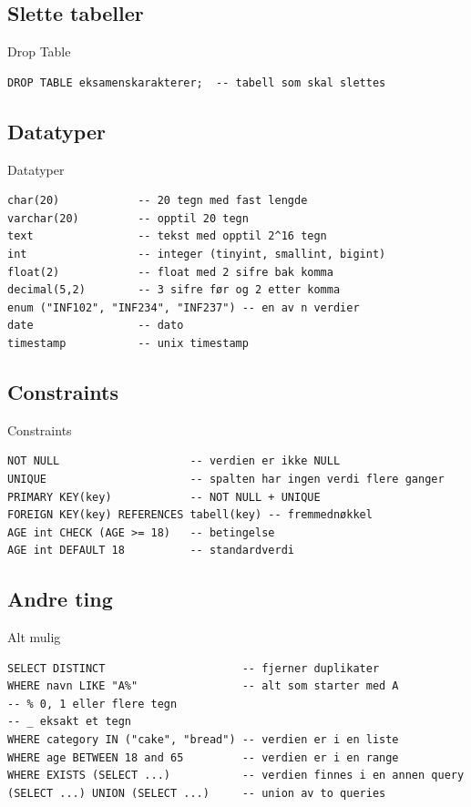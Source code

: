 \subsection*{Slette tabeller}
\begin{frame}[fragile]{Drop Table}
\begin{verbatim}
DROP TABLE eksamenskarakterer;  -- tabell som skal slettes 
\end{verbatim}
\end{frame}

\subsection*{Datatyper}
\begin{frame}[fragile]{Datatyper}
\begin{verbatim}
char(20)            -- 20 tegn med fast lengde
varchar(20)         -- opptil 20 tegn
text                -- tekst med opptil 2^16 tegn
int                 -- integer (tinyint, smallint, bigint)
float(2)            -- float med 2 sifre bak komma
decimal(5,2)        -- 3 sifre før og 2 etter komma
enum ("INF102", "INF234", "INF237") -- en av n verdier
date                -- dato
timestamp           -- unix timestamp
\end{verbatim}
\end{frame}

\subsection*{Constraints}
\begin{frame}[fragile]{Constraints}
\begin{verbatim}
NOT NULL                    -- verdien er ikke NULL
UNIQUE                      -- spalten har ingen verdi flere ganger
PRIMARY KEY(key)            -- NOT NULL + UNIQUE
FOREIGN KEY(key) REFERENCES tabell(key) -- fremmednøkkel
AGE int CHECK (AGE >= 18)   -- betingelse
AGE int DEFAULT 18          -- standardverdi
\end{verbatim}
\end{frame}

\subsection*{Andre ting}
\begin{frame}[fragile]{Alt mulig}
\begin{verbatim}
SELECT DISTINCT                     -- fjerner duplikater
WHERE navn LIKE "A%"                -- alt som starter med A
-- % 0, 1 eller flere tegn
-- _ eksakt et tegn
WHERE category IN ("cake", "bread") -- verdien er i en liste
WHERE age BETWEEN 18 and 65         -- verdien er i en range
WHERE EXISTS (SELECT ...)           -- verdien finnes i en annen query
(SELECT ...) UNION (SELECT ...)     -- union av to queries
\end{verbatim}
\end{frame}

